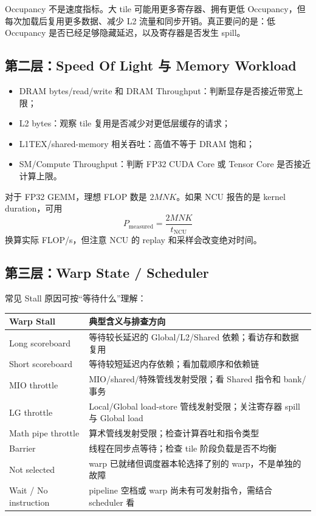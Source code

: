 \documentclass[UTF8,11pt,a4paper,fontset=fandol]{ctexart}
\begin{document}
Occupancy 不是速度指标。大 tile 可能用更多寄存器、拥有更低 Occupancy，但每次加载后复用更多数据、减少 L2 流量和同步开销。真正要问的是：低 Occupancy 是否已经足够隐藏延迟，以及寄存器是否发生 spill。

\subsection{第二层：Speed Of Light 与 Memory Workload}
\begin{itemize}
  \item DRAM bytes/read/write 和 DRAM Throughput：判断显存是否接近带宽上限；
  \item L2 bytes：观察 tile 复用是否减少对更低层缓存的请求；
  \item L1TEX/shared-memory 相关吞吐：高值不等于 DRAM 饱和；
  \item SM/Compute Throughput：判断 FP32 CUDA Core 或 Tensor Core 是否接近计算上限。
\end{itemize}
对于 FP32 GEMM，理想 FLOP 数是 $2MNK$。如果 NCU 报告的是 kernel duration，可用
\[
P_{\mathrm{measured}}=\frac{2MNK}{t_{\mathrm{NCU}}}
\]
换算实际 FLOP/s，但注意 NCU 的 replay 和采样会改变绝对时间。

\subsection{第三层：Warp State / Scheduler}
常见 Stall 原因可按“等待什么”理解：
\begin{table}[H]\centering\small
\begin{tabularx}{\linewidth}{lX}
\toprule
Warp Stall & 典型含义与排查方向\\\midrule
Long scoreboard & 等待较长延迟的 Global/L2/Shared 依赖；看访存和数据复用\\
Short scoreboard & 等待较短延迟内存依赖；看加载顺序和依赖链\\
MIO throttle & MIO/shared/特殊管线发射受限；看 Shared 指令和 bank/事务\\
LG throttle & Local/Global load-store 管线发射受限；关注寄存器 spill 与 Global load\\
Math pipe throttle & 算术管线发射受限；检查计算吞吐和指令类型\\
Barrier & 线程在同步点等待；检查 tile 阶段负载是否不均衡\\
Not selected & warp 已就绪但调度器本轮选择了别的 warp，不是单独的故障\\
Wait / No instruction & pipeline 空档或 warp 尚未有可发射指令，需结合 scheduler 看\\
\bottomrule
\end{tabularx}
\end{table}
\end{document}
